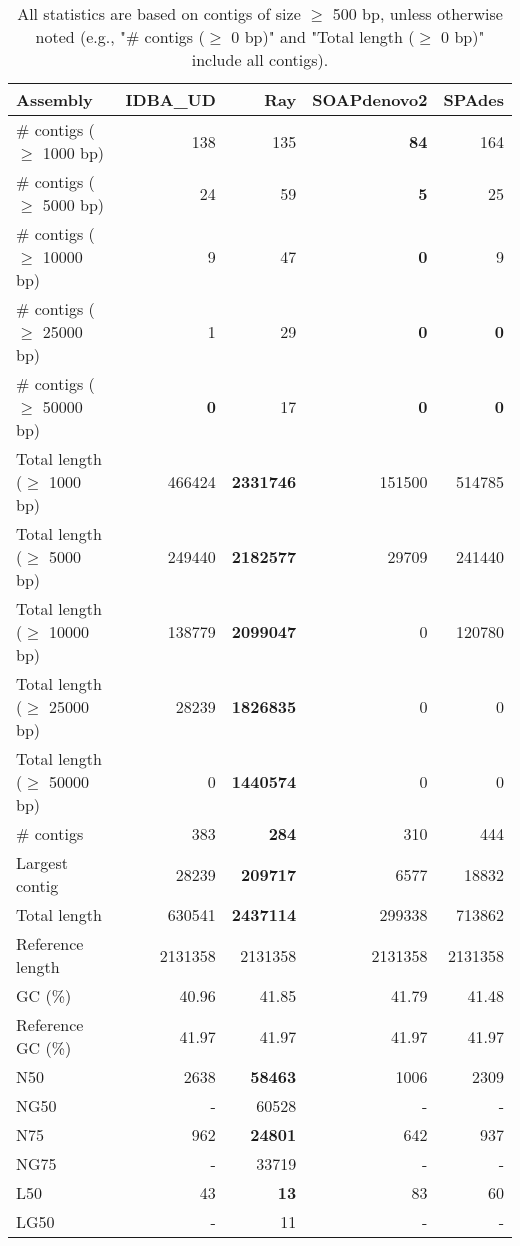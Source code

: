 \documentclass[12pt,a4paper]{article}
\begin{document}
\begin{table}[ht]
\begin{center}
\caption{All statistics are based on contigs of size $\geq$ 500 bp, unless otherwise noted (e.g., "\# contigs ($\geq$ 0 bp)" and "Total length ($\geq$ 0 bp)" include all contigs).}
\begin{tabular}{|l*{4}{|r}|}
\hline
Assembly & IDBA\_UD & Ray & SOAPdenovo2 & SPAdes \\ \hline
\# contigs ($\geq$ 1000 bp) & 138 & 135 & {\bf 84} & 164 \\ \hline
\# contigs ($\geq$ 5000 bp) & 24 & 59 & {\bf 5} & 25 \\ \hline
\# contigs ($\geq$ 10000 bp) & 9 & 47 & {\bf 0} & 9 \\ \hline
\# contigs ($\geq$ 25000 bp) & 1 & 29 & {\bf 0} & {\bf 0} \\ \hline
\# contigs ($\geq$ 50000 bp) & {\bf 0} & 17 & {\bf 0} & {\bf 0} \\ \hline
Total length ($\geq$ 1000 bp) & 466424 & {\bf 2331746} & 151500 & 514785 \\ \hline
Total length ($\geq$ 5000 bp) & 249440 & {\bf 2182577} & 29709 & 241440 \\ \hline
Total length ($\geq$ 10000 bp) & 138779 & {\bf 2099047} & 0 & 120780 \\ \hline
Total length ($\geq$ 25000 bp) & 28239 & {\bf 1826835} & 0 & 0 \\ \hline
Total length ($\geq$ 50000 bp) & 0 & {\bf 1440574} & 0 & 0 \\ \hline
\# contigs & 383 & {\bf 284} & 310 & 444 \\ \hline
Largest contig & 28239 & {\bf 209717} & 6577 & 18832 \\ \hline
Total length & 630541 & {\bf 2437114} & 299338 & 713862 \\ \hline
Reference length & 2131358 & 2131358 & 2131358 & 2131358 \\ \hline
GC (\%) & 40.96 & 41.85 & 41.79 & 41.48 \\ \hline
Reference GC (\%) & 41.97 & 41.97 & 41.97 & 41.97 \\ \hline
N50 & 2638 & {\bf 58463} & 1006 & 2309 \\ \hline
NG50 & - & 60528 & - & - \\ \hline
N75 & 962 & {\bf 24801} & 642 & 937 \\ \hline
NG75 & - & 33719 & - & - \\ \hline
L50 & 43 & {\bf 13} & 83 & 60 \\ \hline
LG50 & - & 11 & - & - \\ \hline

\end{tabular}
\end{center}
\end{table}
\end{document}
